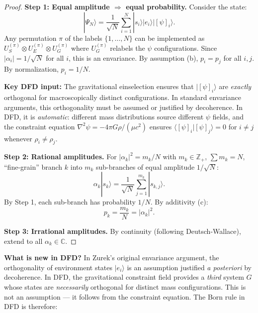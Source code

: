 \documentclass[11pt,a4paper]{article}
\begin{document}
\begin{proof}
\textbf{Step 1: Equal amplitude $\Rightarrow$ equal probability.} Consider the state:
\begin{equation}
|\Psi_N\rangle = \frac{1}{\sqrt{N}}\sum_{i=1}^N |s_i\rangle|e_i\rangle|[\psi]_i\rangle.
\end{equation}
Any permutation $\pi$ of the labels $\{1,\ldots,N\}$ can be implemented as $U_S^{(\pi)} \otimes U_E^{(\pi)} \otimes U_G^{(\pi)}$ where $U_G^{(\pi)}$ relabels the $\psi$ configurations. Since $|\alpha_i| = 1/\sqrt{N}$ for all $i$, this is an envariance. By assumption (b), $p_i = p_j$ for all $i,j$. By normalization, $p_i = 1/N$.

\textbf{Key DFD input:} The gravitational einselection ensures that $|[\psi]_i\rangle$ are \emph{exactly} orthogonal for macroscopically distinct configurations. In standard envariance arguments, this orthogonality must be assumed or justified by decoherence. In DFD, it is \emph{automatic}: different mass distributions source different $\psi$ fields, and the constraint equation $\nabla^2\psi = -4\pi G\rho/(\mu c^2)$ ensures $\langle[\psi]_i|[\psi]_j\rangle = 0$ for $i \neq j$ whenever $\rho_i \neq \rho_j$.

\textbf{Step 2: Rational amplitudes.} For $|\alpha_k|^2 = m_k/N$ with $m_k \in \mathbb{Z}_+$, $\sum m_k = N$, ``fine-grain'' branch $k$ into $m_k$ sub-branches of equal amplitude $1/\sqrt{N}$:
\begin{equation}
\alpha_k|s_k\rangle = \frac{1}{\sqrt{N}}\sum_{j=1}^{m_k}|s_{k,j}\rangle.
\end{equation}
By Step 1, each sub-branch has probability $1/N$. By additivity (c):
\begin{equation}
p_k = \frac{m_k}{N} = |\alpha_k|^2.
\end{equation}

\textbf{Step 3: Irrational amplitudes.} By continuity (following Deutsch-Wallace), extend to all $\alpha_k \in \mathbb{C}$.
\end{proof}

\textbf{What is new in DFD?} In Zurek's original envariance argument, the orthogonality of environment states $|e_i\rangle$ is an assumption justified \emph{a posteriori} by decoherence. In DFD, the gravitational constraint field provides a \emph{third} system $G$ whose states are \emph{necessarily} orthogonal for distinct mass configurations. This is not an assumption --- it follows from the constraint equation. The Born rule in DFD is therefore:
\end{document}
